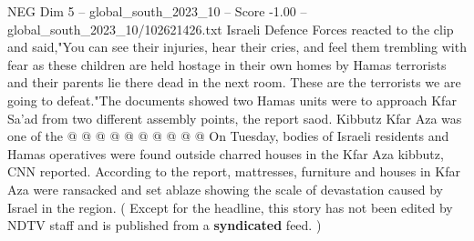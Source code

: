 \begin{textsample}{NEG Dim 5 – global\_south\_2023\_10 – Score -1.00 – global\_south\_2023\_10/102621426.txt}
Israeli Defence Forces reacted to the clip and said,"You can see their injuries, hear their cries, and feel them trembling with fear as these children are held hostage in their own homes by Hamas terrorists and their parents lie there dead in the next room.
These are the terrorists we are going to defeat."The documents showed two Hamas units were to approach Kfar Sa'ad from two different assembly points, the report saod.
Kibbutz Kfar Aza was one of the @ @ @ @ @ @ @ @ @ @ On Tuesday, bodies of Israeli residents and Hamas operatives were found outside charred houses in the Kfar Aza kibbutz, CNN reported.
According to the report, mattresses, furniture and houses in Kfar Aza were ransacked and set ablaze showing the scale of devastation caused by Israel in the region. ( Except for the headline, this story has not been edited by NDTV staff and is published from a \textbf{syndicated} feed. )

\end{textsample}

